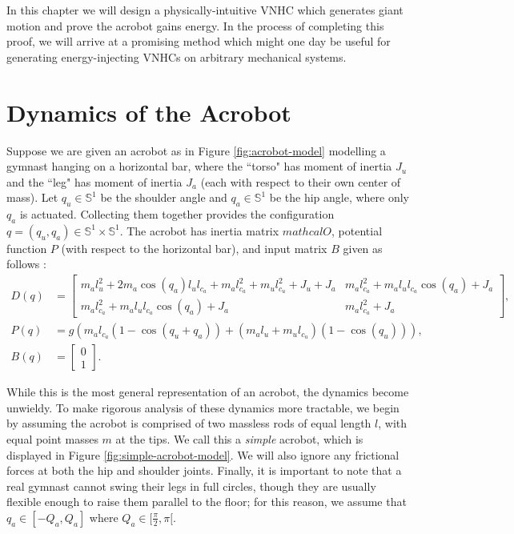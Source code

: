 In this chapter we will design a physically-intuitive VNHC which generates giant
motion and prove the acrobot gains energy. 
In the process of completing this proof, we will arrive at a promising method
which might one day be useful for generating energy-injecting VNHCs on arbitrary
mechanical systems.

\section{Dynamics of the Acrobot}
Suppose we are given an acrobot as in Figure \ref{fig:acrobot-model} modelling a
gymnast hanging on a horizontal bar, where the ``torso" has moment of
inertia \(J_u\) and the ``leg" has moment of inertia \(J_a\) (each with respect
to their own center of mass).
Let \(q_u \in \mathbb{S}^1\) be the shoulder angle and \(q_a \in \mathbb{S}^1\) 
be the hip angle, where only \(q_a\) is actuated. 
Collecting them together provides the configuration
\(q = (q_u,q_a) \in \mathbb{S}^1 \times \mathbb{S}^1\). 
The acrobot has inertia matrix \(mathcal{O}\), potential function \(P\) (with respect to
the horizontal bar), and input matrix \(B\)  given as
follows \cite{xingbo_thesis}:
\begin{align}\label{eqn:general-acrobot-inertia}
    D(q) &= \begin{bmatrix}
      m_al_u^2 + 2m_a\cos(q_a)l_u l_{c_a} + m_al_{c_a}^2 + m_ul_{c_u}^2 + J_u + J_a &
      m_al_{c_a}^2 + m_al_ul_{c_a}\cos(q_a) + J_a \\
      m_al_{c_a}^2 + m_al_ul_{c_a}\cos(q_a) + J_a &
      m_al_{c_a}^2 + J_a
    \end{bmatrix} 
    , \\
    \label{eqn:general-acrobot-potential}
    P(q) &= g\left(m_al_{c_a}(1 - \cos(q_u+q_a)) + 
        (m_al_u + m_ul_{c_u})(1-\cos(q_u))\right) 
    , \\
    B(q) &= \begin{bmatrix} 0 \\ 1 \end{bmatrix}
    .
\end{align}

While this is the most general representation of an acrobot, the dynamics
become unwieldy.
To make rigorous analysis of these dynamics more tractable, we begin by assuming
the acrobot is comprised of two massless rods of equal length \(l\), with equal
point masses \(m\) at the tips.
We call this a \textit{simple} acrobot, which is displayed in Figure
\ref{fig:simple-acrobot-model}.
We will also ignore any frictional forces at both the hip and shoulder joints. 
Finally, it is important to note that a real gymnast cannot swing their legs in
full circles, though they are usually flexible enough to raise them parallel to
the floor; 
for this reason, we assume that \(q_a \in [-Q_a, Q_a]\) where 
\(Q_a \in [\frac{\pi}{2}, \pi[\). 

